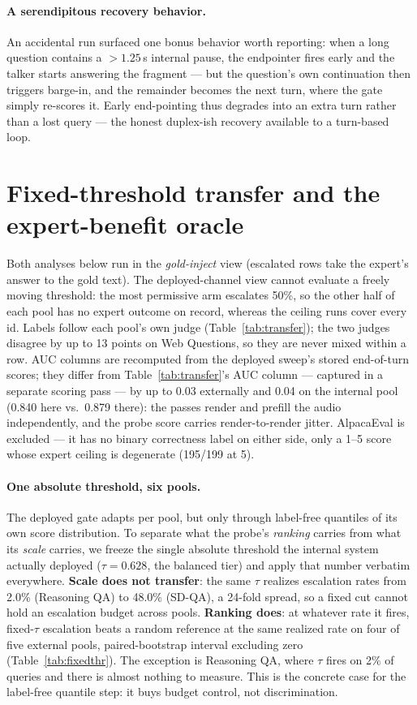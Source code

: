 \paragraph{A serendipitous recovery behavior.}
An accidental run surfaced one bonus behavior worth reporting: when a
long question contains a ${>}1.25$\,s internal pause, the endpointer
fires early and the talker starts answering the fragment --- but the
question's own continuation then triggers barge-in, and the remainder
becomes the next turn, where the gate simply re-scores it. Early
end-pointing thus degrades into an extra turn rather than a lost query
--- the honest duplex-ish recovery available to a turn-based loop.

\section{Fixed-threshold transfer and the expert-benefit oracle}
\label{app:fixedthr}

Both analyses below run in the \emph{gold-inject} view (escalated rows
take the expert's answer to the gold text). The deployed-channel view
cannot evaluate a freely moving threshold: the most permissive arm
escalates 50\%, so the other half of each pool has no expert outcome on
record, whereas the ceiling runs cover every id. Labels follow each
pool's own judge (Table~\ref{tab:transfer}); the two judges disagree by
up to 13 points on Web Questions, so they are never mixed within a row.
AUC columns are recomputed from the deployed sweep's stored
end-of-turn scores; they differ from Table~\ref{tab:transfer}'s AUC
column --- captured in a separate scoring pass --- by up to 0.03
externally and 0.04 on the internal pool (0.840 here vs.\ 0.879 there):
the passes render and prefill the audio independently, and the probe
score carries render-to-render jitter.
AlpacaEval is excluded --- it has no binary correctness label on either
side, only a 1--5 score whose expert ceiling is degenerate (195/199 at
5).

\paragraph{One absolute threshold, six pools.}
The deployed gate adapts per pool, but only through label-free
quantiles of its own score distribution. To separate what the probe's
\emph{ranking} carries from what its \emph{scale} carries, we freeze
the single absolute threshold the internal system actually deployed
($\tau{=}0.628$, the balanced tier) and apply that number verbatim
everywhere. \textbf{Scale does not transfer}: the same $\tau$ realizes
escalation rates from 2.0\% (Reasoning QA) to 48.0\% (SD-QA), a
24-fold spread, so a fixed cut cannot hold an escalation budget across
pools. \textbf{Ranking does}: at whatever rate it fires, fixed-$\tau$
escalation beats a random reference at the same realized rate on four
of five external pools, paired-bootstrap interval excluding zero
(Table~\ref{tab:fixedthr}). The exception is Reasoning QA, where
$\tau$ fires on 2\% of queries and there is almost nothing to measure.
This is the concrete case for the label-free quantile step: it buys
budget control, not discrimination.

